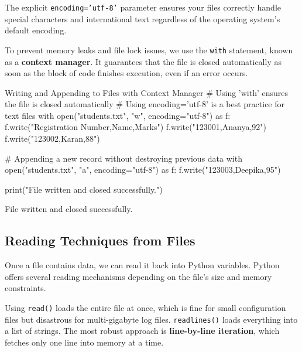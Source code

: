 The explicit \texttt{encoding='utf-8'} parameter ensures your files correctly handle special characters and international text regardless of the operating system's default encoding. 

To prevent memory leaks and file lock issues, we use the \texttt{with} statement, known as a \textbf{context manager}. It guarantees that the file is closed automatically as soon as the block of code finishes execution, even if an error occurs.

\begin{pythoncode}{Writing and Appending to Files with Context Manager}
# Using 'with' ensures the file is closed automatically
# Using encoding='utf-8' is a best practice for text files
with open("students.txt", "w", encoding="utf-8") as f:
    f.write("Registration Number,Name,Marks\n")
    f.write("123001,Ananya,92\n")
    f.write("123002,Karan,88\n")

# Appending a new record without destroying previous data
with open("students.txt", "a", encoding="utf-8") as f:
    f.write("123003,Deepika,95\n")

print("File written and closed successfully.")
\end{pythoncode}
\begin{outputbox}
File written and closed successfully.
\end{outputbox}

\subsection{Reading Techniques from Files}

Once a file contains data, we can read it back into Python variables. Python offers several reading mechanisms depending on the file's size and memory constraints. 

Using \texttt{read()} loads the entire file at once, which is fine for small configuration files but disastrous for multi-gigabyte log files. \texttt{readlines()} loads everything into a list of strings. The most robust approach is \textbf{line-by-line iteration}, which fetches only one line into memory at a time.

